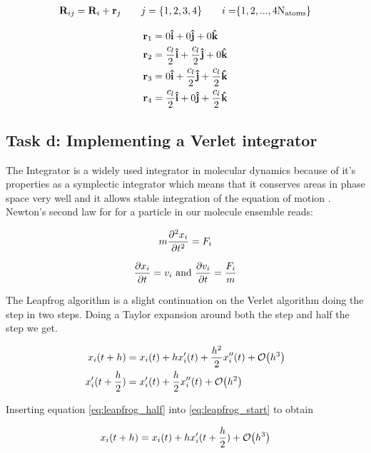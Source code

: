 \documentclass[11pt]{article}
\begin{document}
	\begin{align*}
	\vb{R}_{ij} = \vb{R}_i + \vb{r}_j \qquad{j }= \{1,2,3,4\} \qquad{i = }\{1,2, ... , 4\text{N}_{\text{atoms}}\}
	\end{align*}

	\begin{align*}
		\vb{r}_1 &= 0 \vu{i} + 0 \vu{j} + 0 \vu{k}
		\\
		\vb{r}_2 &= \frac{c_l}{2} \vu{i} + \frac{c_l}{2} \vu{j} + 0 \vu{k}
		\\
		\vb{r}_3 &= 0 \vu{i} + \frac{c_l}{2} \vu{j} + \frac{c_l}{2} \vu{k}
		\\
		\vb{r}_4 &= \frac{c_l}{2} \vu{i} + 0 \vu{j} + \frac{c_l}{2} \vu{k}
	\end{align*}


\subsection{Task d: Implementing a Verlet integrator}


	\label{sub:verlet}
		The Integrator is a widely used integrator in  molecular dynamics \cite{compPhys} because of it's properties as a symplectic integrator which means that it conserves areas in phase space very well and it allows stable integration of the equation of motion \cite{aBInitio}. Newton's second law for for a particle in our molecule ensemble reads:

		\[m\pdv[2]{x_{i}}{t} = F_{i}\]

		\[\pdv{x_{i}}{t} = v_{i} \text{     and     } \pdv{v_{i}}{t} = \frac{F_{i}}{m} \]

		The Leapfrog algorithm is a slight continuation on the Verlet algorithm doing the step in two steps. Doing a Taylor expansion around both the step and half the step we get.
	

		\begin{align}
			x_{i}(t+h) &= x_i(t) + hx_i'(t) + \frac{h^2}{2}x_i''(t) + \order{h^3} \label{eq:leapfrog_start}
			\\
			x_i'(t+ \frac{h}{2} ) &= x_i'(t) + \frac{h}{2} x_i''(t) + \order{h^2} \label{eq:leapfrog_half}
		\end{align}	

		\noindent Inserting equation \eqref{eq:leapfrog_half} into \eqref{eq:leapfrog_start} to obtain

		\begin{equation}
		x_{i}(t+h) = x_i(t) + hx_i'(t+ \frac{h}{2})+ \order{h^3} \label{eq:leapfrog_pos_step}
		\end{equation}
\end{document}
